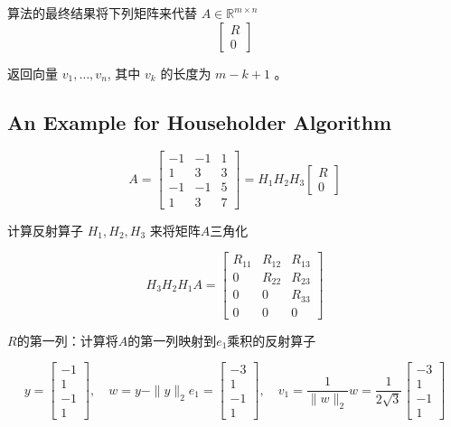    

算法的最终结果将下列矩阵来代替 $ A\in \mathbb{R}^{m \times n}  $
$$
\left[\begin{array}{c}
R \\
0
\end{array}\right]
$$

返回向量 $ v_{1}, \ldots, v_{n} $, 其中 $ v_{k} $ 的长度为 $ m-k+1 $ 。



\subsection{An Example for Householder Algorithm}

\begin{problem}
    $$ A=\left[\begin{array}{rrr}-1 & -1 & 1 \\ 1 & 3 & 3 \\ -1 & -1 & 5 \\ 1 & 3 & 7\end{array}\right]=H_{1} H_{2} H_{3}\left[\begin{array}{l}R \\ 0\end{array}\right] $$

    计算反射算子 $ H_{1}, H_{2}, H_{3} $ 来将矩阵$A$三角化

    $$ H_{3} H_{2} H_{1} A=\left[\begin{array}{ccc}R_{11} & R_{12} & R_{13} \\ 0 & R_{22} & R_{23} \\ 0 & 0 & R_{33} \\ 0 & 0 & 0\end{array}\right] $$

    $R$的第一列：计算将$A$的第一列映射到$e_1$乘积的反射算子

    $$
y=\left[\begin{array}{r}
-1 \\
1 \\
-1 \\
1
\end{array}\right], \quad w=y-\|y\|_{2} e_{1}=\left[\begin{array}{r}
-3 \\
1 \\
-1 \\
1
\end{array}\right], \quad v_{1}=\frac{1}{\|w\|_{2}} w=\frac{1}{2 \sqrt{3}}\left[\begin{array}{r}
-3 \\
1 \\
-1 \\
1
\end{array}\right]
$$


\end{problem}
